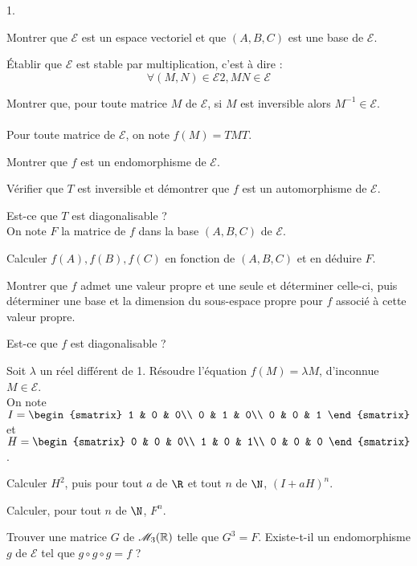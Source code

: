 \documentclass[11pt]{article}%
\begin{document}
\begin{noliste}{1.}
 \setlength{\itemsep}{4mm}
\item Montrer que $\mathcal{E}$ est un espace vectoriel et que
$(A,B,C)$ est une base de $\mathcal{E}$.
\item Établir que $\mathcal{E}$ est stable par multiplication, c'est à
dire :
\[
\forall (M,N)\in \mathcal{E}{2}, MN\in \mathcal{E}
\]
\item Montrer que, pour toute matrice $M$ de $\mathcal{E}$, si $M$ est
inversible alors $M^{-1}\in \mathcal{E}$.\\
\\
Pour toute matrice de $\mathcal{E}$, on note $f(M) = TMT$.
\item Montrer que $f$ est un endomorphisme de $\mathcal{E}$.
\item Vérifier que $T$ est inversible et démontrer que $f$ est un
automorphisme de $\mathcal{E}$.
\item Est-ce que $T$ est diagonalisable ?\\
On note $F$ la matrice de $f$ dans la base $(A,B,C)$ de $\mathcal{E}$.
\item Calculer $f(A), f(B), f(C)$ en fonction de $(A,B,C)$ et en
déduire $F$.
\item Montrer que $f$ admet une valeur propre et une seule et
déterminer celle-ci, puis déterminer une base et la dimension du
sous-espace propre pour $f$ associé à cette valeur propre.
\item Est-ce que $f$ est diagonalisable ?
\item Soit $\lambda$ un réel différent de 1. Résoudre l'équation $f(M)
= \lambda M$, d'inconnue $M\in \mathcal{E}$.\\
On note $I = 
\begin{smatrix}
1 & 0 & 0\\
0 & 1 & 0\\
0 & 0 & 1
\end{smatrix}
$ et $H = 
\begin{smatrix}
0 & 0 & 0\\
1 & 0 & 1\\
0 & 0 & 0
\end{smatrix}
$.
\item Calculer $H^{2}$, puis pour tout $a$ de $\R$ et tout $n$ de $\N$,
$(I + aH)^{n}$.
\item Calculer, pour tout $n$ de $\N$, $F^{n}$.
\item Trouver une matrice $G$ de $\mathscr{M}_{3}(\mathbb{R})$ telle que $G^{3} = F$.
Existe-t-il un endomorphisme $g$ de $\mathcal{E}$ tel que $g\circ
g\circ g = f$ ?\\
\\

\end{noliste}
\end{document}
